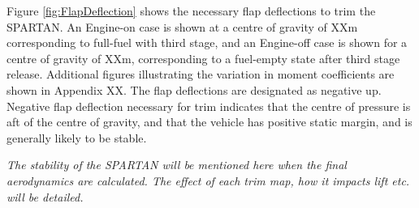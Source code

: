 		Figure \ref{fig:FlapDeflection} shows the necessary flap deflections to trim the SPARTAN. An Engine-on case is shown at a centre of gravity of  XXm corresponding to full-fuel with third stage, and an Engine-off case is shown for a centre of gravity of XXm, corresponding to a fuel-empty state after third stage release. Additional figures illustrating the variation in moment coefficients are shown in Appendix XX.
		The flap deflections are designated as negative up. Negative flap deflection necessary for trim indicates that the centre of pressure is aft of the centre of gravity, and that the vehicle has positive static margin, and is generally likely to be stable. 
		
		\textit{The stability of the SPARTAN will be mentioned here when the final aerodynamics are calculated. The effect of each trim map, how it impacts lift etc. will be detailed.}
		
